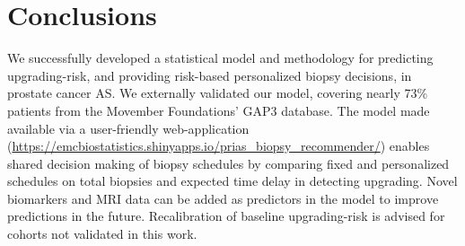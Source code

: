 \section{Conclusions}
We successfully developed a statistical model and methodology for predicting upgrading-risk, and providing risk-based personalized biopsy decisions, in prostate cancer AS. We externally validated our model, covering nearly 73\% patients from the Movember Foundations' GAP3 database. The model made available via a user-friendly web-application (\url{https://emcbiostatistics.shinyapps.io/prias_biopsy_recommender/}) enables shared decision making of biopsy schedules by comparing fixed and personalized schedules on total biopsies and expected time delay in detecting upgrading. Novel biomarkers and MRI data can be added as predictors in the model to improve predictions in the future. Recalibration of baseline upgrading-risk is advised for cohorts not validated in this work.